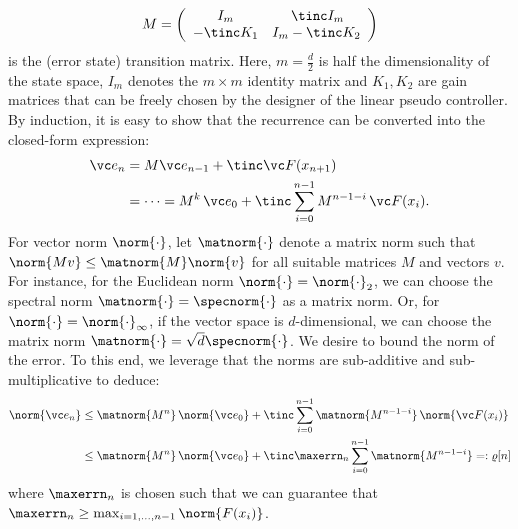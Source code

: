 \begin{equation}
	M = \left(\begin{array}[h]{cc}
				I_m &  \, \tinc I_{m}\\
				-\tinc K_1 & I_m- \tinc K_2 
						\end{array}\right) 
\end{equation}
					is the (error state) transition matrix. 	
Here, $m = \frac d 2$ is half the dimensionality of the state space, $I_m$ denotes the $m \times m$ identity matrix and $K_1,K_2$ are gain matrices that can be freely chosen by the designer of the linear pseudo controller.		
By induction, it is easy to show that the recurrence can be converted into the closed-form expression:
\begin{align*}
	\vc e_n &= M \vc e_{n-1} + \tinc \vc F(x_{n+1})  \\ 
	&= \dots= M^k \, \vc e_0 + \tinc \sum_{i=0}^{n-1} M^{n-1-i} \, \vc F(x_i)	.	
\end{align*}	
For vector norm $\norm{\cdot}$, let $\matnorm{\cdot}$ denote a matrix norm such that $\norm{Mv} \leq \matnorm{M} \norm{v}$ for all suitable matrices $M$ and vectors $v$. For instance, for the Euclidean norm $\norm{\cdot} =\norm{\cdot}_2$, we can choose the spectral norm $\matnorm{\cdot}= \specnorm{\cdot}$ as a matrix norm. Or, for  $\norm{\cdot} =\norm{\cdot}_\infty$, if the vector space is $d$-dimensional, we can choose the matrix norm $\matnorm{\cdot}= \sqrt{d} \specnorm{\cdot}$. We desire to bound the  norm of the error. To this end, we leverage that the norms are sub-additive and sub-multiplicative to deduce: 
\begin{align}
	\norm{\vc e_n} &\leq   \matnorm{M^{n}} \, \norm{\vc e_0} + \tinc \sum_{i=0}^{n-1}  \matnorm{M^{n-1-i}} \, \norm{\vc F(x_i)}		\\
	&\leq \matnorm{M^{n}} \, \norm{\vc e_0} + \tinc \maxerrn_n	 \sum_{i=0}^{n-1}  \matnorm{M^{n-1-i}} =: \varrho[n]
	\label{ineq:errnormbasic}
\end{align}
where  $\maxerrn_n$ is chosen such that we can guarantee that $\maxerrn_n	\geq \max_{i=1,...,n-1} \norm{F(x_i)}$.
